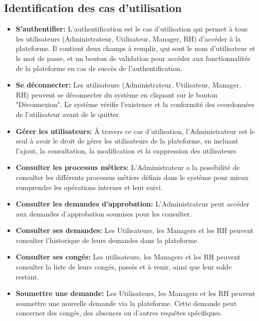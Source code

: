 \subsection{Identification des cas d'utilisation}
\begin{itemize}
 \item \textbf{S'authentifier:} L'authentification est le cas d'utilisation qui permet à tous les utilisateurs (Administrateur, Utilisateur, Manager, RH) d'accéder à la plateforme. Il contient deux champs à remplir, qui sont le nom d'utilisateur et le mot de passe, et un bouton de validation pour accéder aux fonctionnalités de la plateforme en cas de succès de l'authentification.
 
 \item \textbf{Se déconnecter:} Les utilisateurs (Administrateur, Utilisateur, Manager, RH) peuvent se déconnecter du système en cliquant sur le bouton "Déconnexion". Le système vérifie l'existence et la conformité des coordonnées de l'utilisateur avant de le quitter.

 \item \textbf{Gérer les utilisateurs:} À travers ce cas d'utilisation, l'Administrateur est le seul à avoir le droit de gérer les utilisateurs de la plateforme, en incluant l'ajout, la consultation, la modification et la suppression des utilisateurs

 \item \textbf{Consulter les processus métiers:} L'Administrateur a la possibilité de consulter les différents processus métiers définis dans le système pour mieux comprendre les opérations internes et leur suivi.

 \item \textbf{Consulter les demandes d'approbation:} L'Administrateur peut accéder aux demandes d'approbation soumises pour les consulter.

 \item \textbf{Consulter ses demandes:} Les Utilisateurs, les Managers et les RH peuvent consulter l'historique de leurs demandes dans la plateforme.

 \item \textbf{Consulter ses congés:} Les utilisateurs, les Managers et les RH peuvent consulter la liste de leurs congés, passés et à venir, ainsi que leur solde restant.

 \item \textbf{Soumettre une demande:} Les Utilisateurs, les Managers et les RH peuvent soumettre une nouvelle demande via la plateforme. Cette demande peut concerner des congés, des absences ou d'autres requêtes spécifiques.


\end{itemize}
